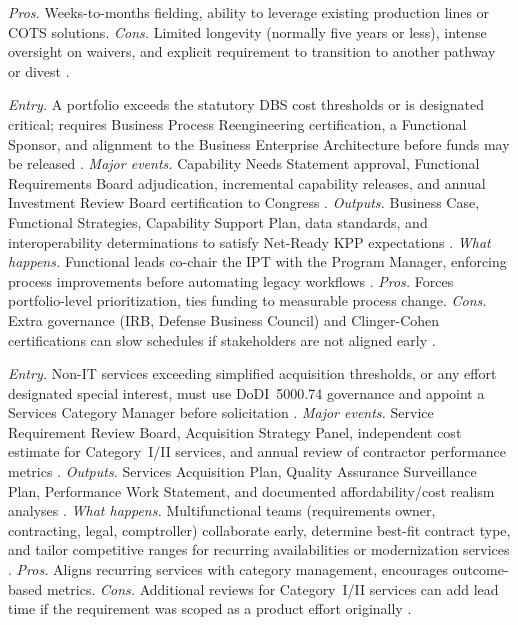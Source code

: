 \documentclass[../main.tex]{subfiles}
\begin{document}
\begin{description}[style=nextline,labelsep=0.5em,font=\bfseries]
    \textit{Pros.} Weeks-to-months fielding, ability to leverage existing production lines or COTS solutions.
    \textit{Cons.} Limited longevity (normally five years or less), intense oversight on waivers, and explicit requirement to transition to another pathway or divest \autocite{DoDI5000-81}.
  \item[Defense Business Systems.]
    \textit{Entry.} A portfolio exceeds the statutory DBS cost thresholds or is designated critical; requires Business Process Reengineering certification, a Functional Sponsor, and alignment to the Business Enterprise Architecture before funds may be released \autocite{DoDI5000-75}.
    \textit{Major events.} Capability Needs Statement approval, Functional Requirements Board adjudication, incremental capability releases, and annual Investment Review Board certification to Congress \autocite{DoDI5000-75}.
    \textit{Outputs.} Business Case, Functional Strategies, Capability Support Plan, data standards, and interoperability determinations to satisfy Net-Ready KPP expectations \autocite{DoDI5000-75}.
    \textit{What happens.} Functional leads co-chair the IPT with the Program Manager, enforcing process improvements before automating legacy workflows \autocite{DoDI5000-75}.
    \textit{Pros.} Forces portfolio-level prioritization, ties funding to measurable process change.
    \textit{Cons.} Extra governance (IRB, Defense Business Council) and Clinger-Cohen certifications can slow schedules if stakeholders are not aligned early \autocite{DoDI5000-75}.
  \item[Defense Acquisition of Services.]
    \textit{Entry.} Non-IT services exceeding simplified acquisition thresholds, or any effort designated special interest, must use DoDI~5000.74 governance and appoint a Services Category Manager before solicitation \autocite{DoDI5000-74}.
    \textit{Major events.} Service Requirement Review Board, Acquisition Strategy Panel, independent cost estimate for Category~I/II services, and annual review of contractor performance metrics \autocite{DoDI5000-74}.
    \textit{Outputs.} Services Acquisition Plan, Quality Assurance Surveillance Plan, Performance Work Statement, and documented affordability/cost realism analyses \autocite{DoDI5000-74}.
    \textit{What happens.} Multifunctional teams (requirements owner, contracting, legal, comptroller) collaborate early, determine best-fit contract type, and tailor competitive ranges for recurring availabilities or modernization services \autocite{DoDI5000-74}.
    \textit{Pros.} Aligns recurring services with category management, encourages outcome-based metrics.
    \textit{Cons.} Additional reviews for Category~I/II services can add lead time if the requirement was scoped as a product effort originally \autocite{DoDI5000-74}.
\end{description}
\end{document}
